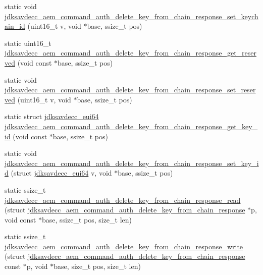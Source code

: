 \begin{DoxyCompactItemize}
\item 
static void \hyperlink{group__command__auth__delete__key__from__chain__response_gac1598617db3a583f1ba0e4e646fe3769}{jdksavdecc\+\_\+aem\+\_\+command\+\_\+auth\+\_\+delete\+\_\+key\+\_\+from\+\_\+chain\+\_\+response\+\_\+set\+\_\+keychain\+\_\+id} (uint16\+\_\+t v, void $\ast$base, ssize\+\_\+t pos)
\item 
static uint16\+\_\+t \hyperlink{group__command__auth__delete__key__from__chain__response_gaea8769f4843c3e00098b74a54618717c}{jdksavdecc\+\_\+aem\+\_\+command\+\_\+auth\+\_\+delete\+\_\+key\+\_\+from\+\_\+chain\+\_\+response\+\_\+get\+\_\+reserved} (void const $\ast$base, ssize\+\_\+t pos)
\item 
static void \hyperlink{group__command__auth__delete__key__from__chain__response_ga04d78f5c1e83b34088ca91f89185ad5e}{jdksavdecc\+\_\+aem\+\_\+command\+\_\+auth\+\_\+delete\+\_\+key\+\_\+from\+\_\+chain\+\_\+response\+\_\+set\+\_\+reserved} (uint16\+\_\+t v, void $\ast$base, ssize\+\_\+t pos)
\item 
static struct \hyperlink{structjdksavdecc__eui64}{jdksavdecc\+\_\+eui64} \hyperlink{group__command__auth__delete__key__from__chain__response_ga096de062c9d18253301a80a27a3f78a2}{jdksavdecc\+\_\+aem\+\_\+command\+\_\+auth\+\_\+delete\+\_\+key\+\_\+from\+\_\+chain\+\_\+response\+\_\+get\+\_\+key\+\_\+id} (void const $\ast$base, ssize\+\_\+t pos)
\item 
static void \hyperlink{group__command__auth__delete__key__from__chain__response_gaa6705b0b19fcbcbf9b628b84f39fe5c8}{jdksavdecc\+\_\+aem\+\_\+command\+\_\+auth\+\_\+delete\+\_\+key\+\_\+from\+\_\+chain\+\_\+response\+\_\+set\+\_\+key\+\_\+id} (struct \hyperlink{structjdksavdecc__eui64}{jdksavdecc\+\_\+eui64} v, void $\ast$base, ssize\+\_\+t pos)
\item 
static ssize\+\_\+t \hyperlink{group__command__auth__delete__key__from__chain__response_ga6891c40b7387cc6e19f8c4f4656d8aa5}{jdksavdecc\+\_\+aem\+\_\+command\+\_\+auth\+\_\+delete\+\_\+key\+\_\+from\+\_\+chain\+\_\+response\+\_\+read} (struct \hyperlink{structjdksavdecc__aem__command__auth__delete__key__from__chain__response}{jdksavdecc\+\_\+aem\+\_\+command\+\_\+auth\+\_\+delete\+\_\+key\+\_\+from\+\_\+chain\+\_\+response} $\ast$p, void const $\ast$base, ssize\+\_\+t pos, size\+\_\+t len)
\item 
static ssize\+\_\+t \hyperlink{group__command__auth__delete__key__from__chain__response_ga51a5b3ee4cd46ba10a72bddc0b48c26b}{jdksavdecc\+\_\+aem\+\_\+command\+\_\+auth\+\_\+delete\+\_\+key\+\_\+from\+\_\+chain\+\_\+response\+\_\+write} (struct \hyperlink{structjdksavdecc__aem__command__auth__delete__key__from__chain__response}{jdksavdecc\+\_\+aem\+\_\+command\+\_\+auth\+\_\+delete\+\_\+key\+\_\+from\+\_\+chain\+\_\+response} const $\ast$p, void $\ast$base, size\+\_\+t pos, size\+\_\+t len)
\end{DoxyCompactItemize}


